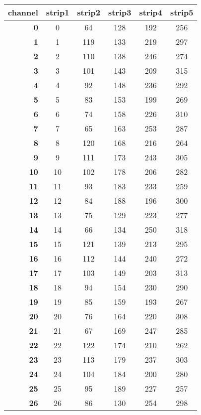   \begin{longtable}{|r|c|c|c|c|c|}    
    \hline
    \textbf{channel} & strip1 & strip2 & strip3 & strip4& strip5 \\
    \hline
    \textbf{0} & 0 &64 & 128 & 192 & 256 \\
    \textbf{1} & 1 &119 & 133 & 219 & 297 \\
    \textbf{2} & 2 &110 & 138 & 246 & 274 \\
    \textbf{3} & 3 &101 & 143 & 209 & 315 \\
    \textbf{4} & 4 &92 & 148 & 236 & 292 \\
    \textbf{5} & 5 &83 & 153 & 199 & 269 \\
    \textbf{6} & 6 &74 & 158 & 226 & 310 \\
    \textbf{7} & 7 &65 & 163 & 253 & 287 \\
    \textbf{8} & 8 &120 & 168 & 216 & 264 \\
    \textbf{9} & 9 &111 & 173 & 243 & 305 \\
    \textbf{10} & 10 &102 & 178 & 206 & 282 \\
    \textbf{11} & 11 &93 & 183 & 233 & 259 \\
    \textbf{12} & 12 &84 & 188 & 196 & 300 \\
    \textbf{13} & 13 &75 & 129 & 223 & 277 \\
    \textbf{14} & 14 &66 & 134 & 250 & 318 \\
    \textbf{15} & 15 &121 & 139 & 213 & 295 \\
    \textbf{16} & 16 &112 & 144 & 240 & 272 \\
    \textbf{17} & 17 &103 & 149 & 203 & 313 \\
    \textbf{18} & 18 &94 & 154 & 230 & 290 \\
    \textbf{19} & 19 &85 & 159 & 193 & 267 \\
    \textbf{20} & 20 &76 & 164 & 220 & 308 \\
    \textbf{21} & 21 &67 & 169 & 247 & 285 \\
    \textbf{22} & 22 &122 & 174 & 210 & 262 \\
    \textbf{23} & 23 &113 & 179 & 237 & 303 \\
    \textbf{24} & 24 &104 & 184 & 200 & 280 \\
    \textbf{25} & 25 &95 & 189 & 227 & 257 \\
    \textbf{26} & 26 &86 & 130 & 254 & 298 \\

\end{longtable}
